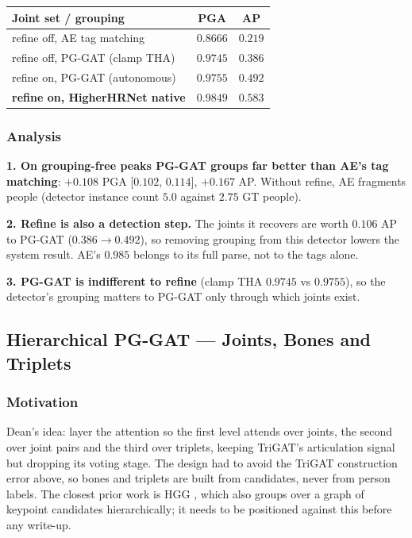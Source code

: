\begin{tabular}{lcc}
\hline
\textbf{Joint set / grouping} & \textbf{PGA} & \textbf{AP} \\
\hline
refine off, AE tag matching          & $0.8666$ & $0.219$ \\
refine off, PG-GAT (clamp THA)       & $0.9745$ & $0.386$ \\
refine on, PG-GAT (autonomous)       & $0.9755$ & $0.492$ \\
\textbf{refine on, HigherHRNet native} & $\mathbf{0.9849}$ & $\mathbf{0.583}$ \\
\hline
\end{tabular}

\subsubsection{Analysis}

\textbf{1. On grouping-free peaks PG-GAT groups far better than AE's tag matching}: $+0.108$ PGA [$0.102$, $0.114$], $+0.167$ AP. Without refine, AE fragments people (detector instance count $5.0$ against $2.75$ GT people).

\textbf{2. Refine is also a detection step.} The joints it recovers are worth $0.106$ AP to PG-GAT ($0.386 \rightarrow 0.492$), so removing grouping from this detector lowers the system result. AE's $0.985$ belongs to its full parse, not to the tags alone.

\textbf{3. PG-GAT is indifferent to refine} (clamp THA $0.9745$ vs $0.9755$), so the detector's grouping matters to PG-GAT only through which joints exist.

\subsection{Hierarchical PG-GAT --- Joints, Bones and Triplets}

\subsubsection{Motivation}

Dean's idea: layer the attention so the first level attends over joints, the second over joint pairs and the third over triplets, keeping TriGAT's articulation signal but dropping its voting stage.
The design had to avoid the TriGAT construction error above, so bones and triplets are built from candidates, never from person labels.
The closest prior work is HGG \cite{jin2020hgg}, which also groups over a graph of keypoint candidates hierarchically; it needs to be positioned against this before any write-up.


